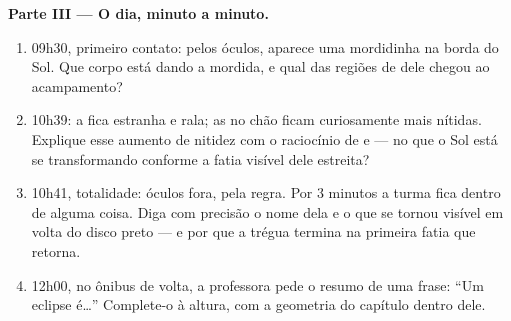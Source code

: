 \begin{problem}
\medskip\noindent\textbf{Parte III --- O dia, minuto a minuto.}
\begin{enumerate}[resume]
  \item 09h30, primeiro contato: pelos óculos, aparece uma
        mordidinha na borda do Sol. Que corpo está dando a mordida, e
        qual das regiões de  dele chegou ao acampamento?
  \item 10h39: a  fica estranha e rala; as  no chão ficam
        curiosamente mais nítidas. Explique esse aumento de nitidez
        com o raciocínio de  e  --- no que o Sol está se
        transformando conforme a fatia visível dele estreita?
  \item 10h41, totalidade: óculos fora, pela regra. Por $3$ minutos a
        turma fica dentro de alguma coisa. Diga com precisão o nome
        dela e o que se tornou visível em volta do disco preto --- e
        por que a trégua termina na primeira fatia que retorna.
  \item 12h00, no ônibus de volta, a professora pede o resumo de uma
        frase: ``Um eclipse é\dots'' Complete-o à altura, com a
        geometria do capítulo dentro dele.
\end{enumerate}
\end{problem}
